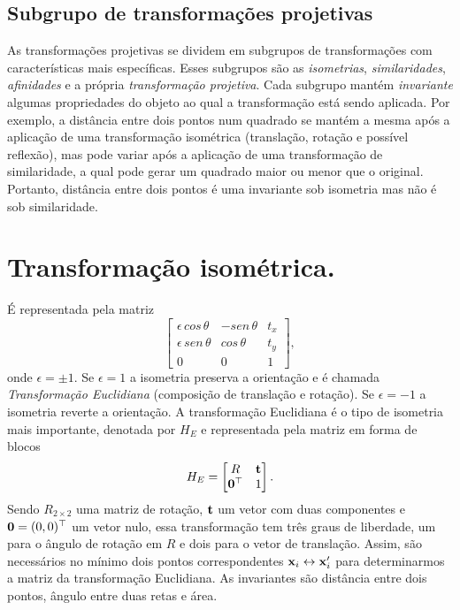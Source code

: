 \subsection{Subgrupo de transformações projetivas}\label{sec.hierarquia-transformacoes}
As transformações projetivas se dividem em subgrupos de transformações com características mais específicas. Esses subgrupos são as \textit{isometrias}, \textit{similaridades}, \textit{afinidades} e a própria \textit{transformação projetiva}. Cada subgrupo mantém \textit{invariante} algumas propriedades do objeto ao qual a transformação está sendo aplicada. Por exemplo, a distância entre dois pontos num quadrado se mantém a mesma após a aplicação de uma transformação isométrica (translação, rotação e possível reflexão), mas pode variar após a aplicação de uma transformação de similaridade, a qual pode gerar um quadrado maior ou menor que o original. Portanto, distância entre dois pontos é uma invariante sob isometria mas não é sob similaridade.
\section*{Transformação isométrica.}
É representada pela matriz
\begin{equation*}
\begin{bmatrix}
\epsilon\,cos\,\theta&-sen\,\theta&t_x\\
\epsilon\,sen\,\theta&cos\,\theta&t_y\\
0&0&1
\end{bmatrix},
\end{equation*}
onde $\epsilon=\pm1$. Se $\epsilon=1$ a isometria preserva a orientação e é chamada \textit{Transformação Euclidiana} (composição de translação e rotação). Se $\epsilon=-1$ a isometria reverte a orientação. A transformação Euclidiana é o tipo de isometria mais importante, denotada por $H_E$ e representada pela matriz em forma de blocos
\begin{equation*}
H_E=
\begin{bmatrix}
R&{\bf t}\\
{\bf 0}^\top&1
\end{bmatrix}.
\end{equation*}
Sendo $R_{2\times2}$ uma matriz de rotação, ${\bf t}$ um vetor com duas componentes e ${\bf 0}=(0,0)^\top$ um vetor nulo, essa transformação tem três graus de liberdade, um para o ângulo de rotação em $R$ e dois para o vetor de translação. Assim, são necessários no mínimo dois pontos correspondentes $\mathbf{x}_i\leftrightarrow\mathbf{x}'_i$ para determinarmos a matriz da transformação Euclidiana. As invariantes são distância entre dois pontos, ângulo entre duas retas e área. 
